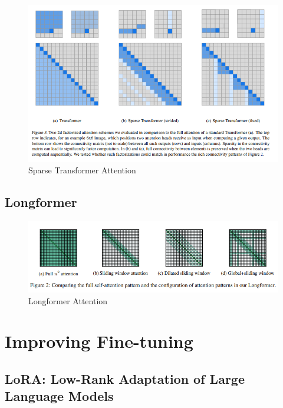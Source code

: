 \documentclass[11pt]{article}
\theoremstyle{definition}
\begin{document}
\begin{figure}
\centering
  \includegraphics[width=\textwidth,height=\textheight,keepaspectratio]{transformers/sparse_transformer_attention.png}
  \caption{Sparse Transformer Attention \cite{child2019generating}}
  \label{fig:sparse_transformer_attention}
\end{figure}

\subsection{Longformer \cite{beltagy2020longformer}}

\begin{figure}
\centering
  \includegraphics[width=\textwidth,height=\textheight,keepaspectratio]{transformers/longformer.png}
  \caption{Longformer Attention \cite{beltagy2020longformer}}
  \label{fig:longformer}
\end{figure}

\section{Improving Fine-tuning}

\subsection{LoRA: Low-Rank Adaptation of Large Language Models \cite{hu2021lora}}
\end{document}
